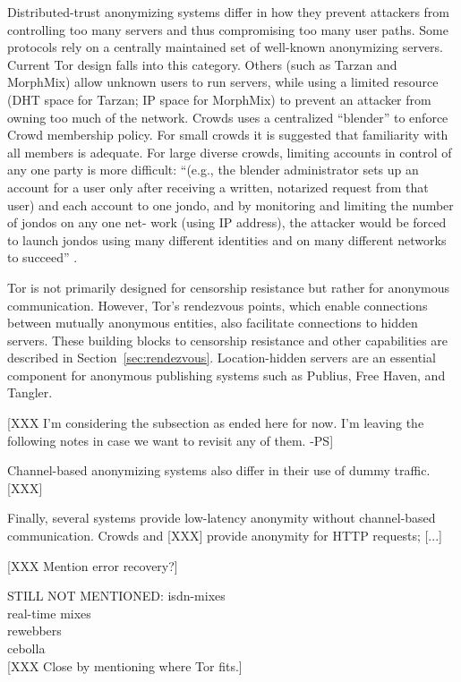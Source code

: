\documentclass[times,10pt,twocolumn]{article}
\begin{document}
Distributed-trust anonymizing systems differ in how they prevent attackers
from controlling too many servers and thus compromising too many user paths.
Some protocols rely on a centrally maintained set of well-known anonymizing
servers.  Current Tor design falls into this category.
Others (such as Tarzan and MorphMix) allow unknown users to run
servers, while using a limited resource (DHT space for Tarzan; IP space for
MorphMix) to prevent an attacker from owning too much of the network.
Crowds uses a centralized ``blender'' to enforce Crowd membership
policy. For small crowds it is suggested that familiarity with all
members is adequate. For large diverse crowds, limiting accounts in
control of any one party is more difficult: 
``(e.g., the blender administrator sets up an account for a user only
after receiving a written, notarized request from that user) and each
account to one jondo, and by monitoring and limiting the number of
jondos on any one net- work (using IP address), the attacker would be
forced to launch jondos using many different identities and on many
different networks to succeed'' \cite{crowds-tissec}.

Tor is not primarily designed for censorship resistance but rather
for anonymous communication. However, Tor's rendezvous points, which
enable connections between mutually anonymous entities, also
facilitate connections to hidden servers.  These building blocks to
censorship resistance and other capabilities are described in
Section~\ref{sec:rendezvous}.  Location-hidden servers are an
essential component for anonymous publishing systems such as
Publius\cite{publius}, Free Haven\cite{freehaven-berk}, and
Tangler\cite{tangler}.

[XXX I'm considering the subsection as ended here for now. I'm leaving the
following notes in case we want to revisit any of them. -PS]

Channel-based anonymizing systems also differ in their use of dummy traffic.
[XXX]

Finally, several systems provide low-latency anonymity without channel-based
communication.  Crowds and [XXX] provide anonymity for HTTP requests; [...]

[XXX Mention error recovery?]

STILL NOT MENTIONED:
isdn-mixes\\
real-time mixes\\
rewebbers\\
cebolla\\

[XXX Close by mentioning where Tor fits.]
\end{document}
